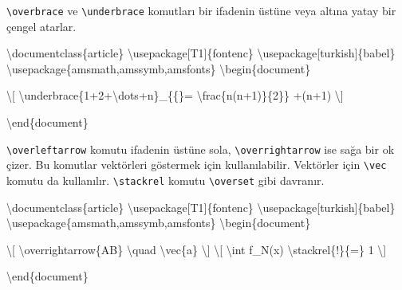\documentclass[
  letterpaper,
  DIV=11,
  numbers=noendperiod]{scrreprt}
\newenvironment{Shaded}{\begin{snugshade}}{\end{snugshade}}
\newcommand{\BuiltInTok}[1]{\textcolor[rgb]{0.00,0.23,0.31}{#1}}
\newcommand{\ExtensionTok}[1]{\textcolor[rgb]{0.00,0.23,0.31}{#1}}
\newcommand{\KeywordTok}[1]{\textcolor[rgb]{0.00,0.23,0.31}{#1}}
\newcommand{\NormalTok}[1]{\textcolor[rgb]{0.00,0.23,0.31}{#1}}
\newcommand{\SpecialCharTok}[1]{\textcolor[rgb]{0.37,0.37,0.37}{#1}}
\newcommand{\SpecialStringTok}[1]{\textcolor[rgb]{0.13,0.47,0.30}{#1}}
\begin{document}
\texttt{\textbackslash{}overbrace} ve
\texttt{\textbackslash{}underbrace} komutları bir ifadenin üstüne veya
altına yatay bir çengel atarlar.

\begin{Shaded}
\begin{Highlighting}[]
\BuiltInTok{\textbackslash{}documentclass}\NormalTok{\{}\ExtensionTok{article}\NormalTok{\}}
\BuiltInTok{\textbackslash{}usepackage}\NormalTok{[T1]\{}\ExtensionTok{fontenc}\NormalTok{\}}
\BuiltInTok{\textbackslash{}usepackage}\NormalTok{[turkish]\{}\ExtensionTok{babel}\NormalTok{\}}
\BuiltInTok{\textbackslash{}usepackage}\NormalTok{\{}\ExtensionTok{amsmath,amssymb,amsfonts}\NormalTok{\}}
\KeywordTok{\textbackslash{}begin}\NormalTok{\{}\ExtensionTok{document}\NormalTok{\}}

\SpecialStringTok{\textbackslash{}[}
\SpecialCharTok{\textbackslash{}underbrace}\SpecialStringTok{\{1+2+}\SpecialCharTok{\textbackslash{}dots}\SpecialStringTok{+n\}\_\{\{\}=}
\SpecialCharTok{\textbackslash{}frac}\SpecialStringTok{\{n(n+1)\}\{2\}\}}
\SpecialStringTok{+(n+1)}
\SpecialStringTok{\textbackslash{}]}

\KeywordTok{\textbackslash{}end}\NormalTok{\{}\ExtensionTok{document}\NormalTok{\}}
\end{Highlighting}
\end{Shaded}

\texttt{\textbackslash{}overleftarrow} komutu ifadenin üstüne sola,
\texttt{\textbackslash{}overrightarrow} ise sağa bir ok çizer. Bu
komutlar vektörleri göstermek için kullanılabilir. Vektörler için
\texttt{\textbackslash{}vec} komutu da kullanılır.
\texttt{\textbackslash{}stackrel} komutu
\texttt{\textbackslash{}overset} gibi davranır.

\begin{Shaded}
\begin{Highlighting}[]
\BuiltInTok{\textbackslash{}documentclass}\NormalTok{\{}\ExtensionTok{article}\NormalTok{\}}
\BuiltInTok{\textbackslash{}usepackage}\NormalTok{[T1]\{}\ExtensionTok{fontenc}\NormalTok{\}}
\BuiltInTok{\textbackslash{}usepackage}\NormalTok{[turkish]\{}\ExtensionTok{babel}\NormalTok{\}}
\BuiltInTok{\textbackslash{}usepackage}\NormalTok{\{}\ExtensionTok{amsmath,amssymb,amsfonts}\NormalTok{\}}
\KeywordTok{\textbackslash{}begin}\NormalTok{\{}\ExtensionTok{document}\NormalTok{\}}

\SpecialStringTok{\textbackslash{}[}
\SpecialCharTok{\textbackslash{}overrightarrow}\SpecialStringTok{\{AB\} }\SpecialCharTok{\textbackslash{}quad}\SpecialStringTok{ }\SpecialCharTok{\textbackslash{}vec}\SpecialStringTok{\{a\}}
\SpecialStringTok{\textbackslash{}]}
\SpecialStringTok{\textbackslash{}[}
\SpecialCharTok{\textbackslash{}int}\SpecialStringTok{ f\_N(x) }\SpecialCharTok{\textbackslash{}stackrel}\SpecialStringTok{\{!\}\{=\} 1}
\SpecialStringTok{\textbackslash{}]}

\KeywordTok{\textbackslash{}end}\NormalTok{\{}\ExtensionTok{document}\NormalTok{\}}
\end{Highlighting}
\end{Shaded}
\end{document}
